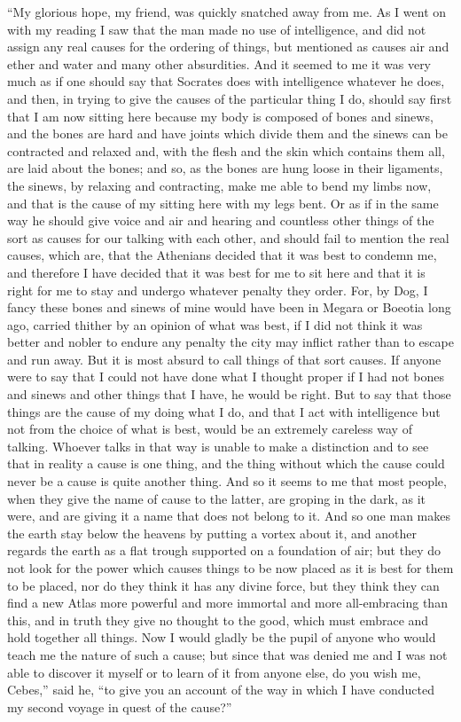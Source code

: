 \documentclass[letterpaper,12pt]{article}
\newcommand{\stephpag}[1]{\marginnote{\small\itshape\fontfamily{ppl}\selectfont #1}}
\begin{document}
\begin{drama}
``My glorious hope, my friend, was quickly snatched away from me. As I went on with my reading I saw that the man made no use of intelligence, \stephpag{c} and did not assign any real causes for the ordering of things, but mentioned as causes air and ether and water and many other absurdities. And it seemed to me it was very much as if one should say that Socrates does with intelligence whatever he does, and then, in trying to give the causes of the particular thing I do, should say first that I am now sitting here because my body is composed of bones and sinews, and the bones are hard and have joints which divide them and the sinews \stephpag{d} can be contracted and relaxed and, with the flesh and the skin which contains them all, are laid about the bones; and so, as the bones are hung loose in their ligaments, the sinews, by relaxing and contracting, make me able to bend my limbs now, and that is the cause of my sitting here with my legs bent. Or as if in the same way he should give voice and air and hearing and countless other things of the sort as causes for our talking with each other, \stephpag{e} and should fail to mention the real causes, which are, that the Athenians decided that it was best to condemn me, and therefore I have decided that it was best for me to sit here and that it is right for me to stay and undergo whatever penalty they order. \stephpag{99 a} For, by Dog, I fancy these bones and sinews of mine would have been in Megara or Boeotia long ago, carried thither by an opinion of what was best, if I did not think it was better and nobler to endure any penalty the city may inflict rather than to escape and run away. But it is most absurd to call things of that sort causes. If anyone were to say that I could not have done what I thought proper if I had not bones and sinews and other things that I have, he would be right. But to say that those things are the cause of my doing what I do, \stephpag{b} and that I act with intelligence but not from the choice of what is best, would be an extremely careless way of talking. Whoever talks in that way is unable to make a distinction and to see that in reality a cause is one thing, and the thing without which the cause could never be a cause is quite another thing. And so it seems to me that most people, when they give the name of cause to the latter, are groping in the dark, as it were, and are giving it a name that does not belong to it. And so one man makes the earth stay below the heavens by putting a vortex about it, and another regards the earth as a flat trough supported on a foundation of air; but they do not look for \stephpag{c} the power which causes things to be now placed as it is best for them to be placed, nor do they think it has any divine force, but they think they can find a new Atlas more powerful and more immortal and more all-embracing than this, and in truth they give no thought to the good, which must embrace and hold together all things. Now I would gladly be the pupil of anyone who would teach me the nature of such a cause; but since that was denied me and I was not able to discover it myself or to learn of it from anyone else, \stephpag{d} do you wish me, Cebes,'' said he, ``to give you an account of the way in which I have conducted my second voyage in quest of the cause?''
 

\end{drama}
\end{document}
